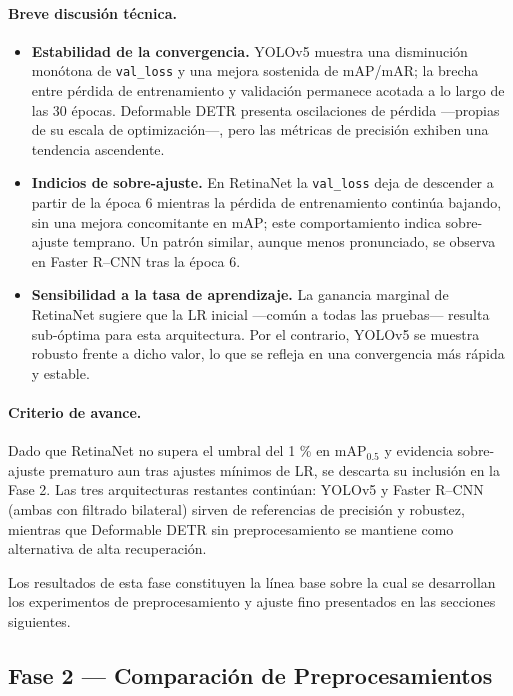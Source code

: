 \paragraph{Breve discusión técnica.}
\begin{itemize}
  \item \textbf{Estabilidad de la convergencia.}
        YOLOv5 muestra una disminución monótona de \texttt{val\_loss} y una mejora sostenida de mAP/mAR; la brecha entre pérdida de entrenamiento y validación permanece acotada a lo largo de las 30 épocas.
        Deformable DETR presenta oscilaciones de pérdida —propias de su escala de optimización—, pero las métricas de precisión exhiben una tendencia ascendente.
  \item \textbf{Indicios de sobre-ajuste.}
        En RetinaNet la \texttt{val\_loss} deja de descender a partir de la época 6 mientras la pérdida de entrenamiento continúa bajando, sin una mejora concomitante en mAP; este comportamiento indica sobre-ajuste temprano.
        Un patrón similar, aunque menos pronunciado, se observa en Faster R–CNN tras la época 6.
  \item \textbf{Sensibilidad a la tasa de aprendizaje.}
        La ganancia marginal de RetinaNet sugiere que la LR inicial —común a todas las pruebas— resulta sub-óptima para esta arquitectura.
        Por el contrario, YOLOv5 se muestra robusto frente a dicho valor, lo que se refleja en una convergencia más rápida y estable.
\end{itemize}

\paragraph{Criterio de avance.}
Dado que RetinaNet no supera el umbral del 1 \% en mAP$_{0.5}$ y evidencia sobre-ajuste prematuro aun tras ajustes mínimos de LR, se descarta su inclusión en la Fase 2.
Las tres arquitecturas restantes continúan: YOLOv5 y Faster R–CNN (ambas con filtrado bilateral) sirven de referencias de precisión y robustez, mientras que Deformable DETR sin preprocesamiento se mantiene como alternativa de alta recuperación.

\vspace{0.5em}
Los resultados de esta fase constituyen la línea base sobre la cual se desarrollan los experimentos de preprocesamiento y ajuste fino presentados en las secciones siguientes.

\subsection{Fase 2 — Comparación de Preprocesamientos}
\label{ssec:fase2}

